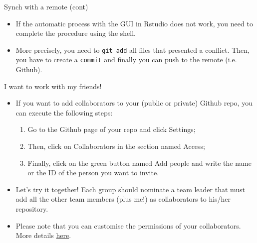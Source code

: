 \documentclass[
hyperref={bookmarks=false},
xcolor={dvipsnames,svgnames*,x11names*}, 
12pt
]{beamer}
\begin{document}
\begin{frame}{Synch with a remote (cont)}
\vspace{-0.5cm}
\begin{itemize}
\itemsep 3ex
\item If the automatic process with the GUI in Rstudio does not work, you need to complete the procedure using the shell. 
\item More precisely, you need to \texttt{git add} all files that presented a conflict. Then, you have to create a \texttt{commit} and finally you can push to the remote (i.e. Github). 
\end{itemize}
\end{frame}

\begin{frame}{I want to work with my friends!}
\vspace{-0.5cm}
\begin{itemize}
\itemsep 3ex
\item If you want to add collaborators to your (public or private) Github repo, you can execute the following steps:
\begin{enumerate}
\item Go to the Github page of your repo and click Settings; 
\item Then, click on Collaborators in the section named Access; 
\item Finally, click on the green button named Add people and write the name or the ID of the person you want to invite.  
\end{enumerate}
\item Let's try it together! Each group should nominate a team leader that must add all the other team members (plus me!) as collaborators to his/her repository. 
\item Please note that you can customise the permissions of your collaborators. More details \href{https://docs.github.com/en/organizations/managing-user-access-to-your-organizations-repositories/repository-roles-for-an-organization}{here}. 
\end{itemize}
\end{frame}
\end{document}
